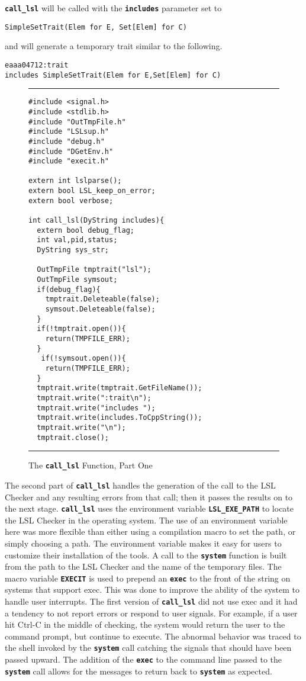 \documentclass[12pt]{article} %
\newcommand{\reserved}[1]{\textbf{\texttt{#1}}} %
\newcommand{\UNSPACEFORBOX}{\vspace{-2ex}}
\newcommand{\HLINE}{\UNSPACEFORBOX%
\begin{flushleft}\rule{\textwidth}{0.01in}\end{flushleft}%
\UNSPACEFORBOX}
\newenvironment{BFIGURE}{

\begin{figure}
\small
\HLINE
}{
\HLINE
\normalsize
\end{figure}
}
\begin{document}
\reserved{call\_lsl} will be called with the \reserved{includes}
parameter set to
\begin{verbatim}
SimpleSetTrait(Elem for E, Set[Elem] for C)
\end{verbatim}
and will generate a temporary trait similar to the following.
\begin{verbatim}
eaaa04712:trait
includes SimpleSetTrait(Elem for E,Set[Elem] for C)
\end{verbatim}

\begin{BFIGURE}
\begin{verbatim}
#include <signal.h>
#include <stdlib.h>
#include "OutTmpFile.h"
#include "LSLsup.h"
#include "debug.h"
#include "DGetEnv.h"
#include "execit.h"

extern int lslparse();
extern bool LSL_keep_on_error;
extern bool verbose;

int call_lsl(DyString includes){
  extern bool debug_flag;
  int val,pid,status;
  DyString sys_str;
  
  OutTmpFile tmptrait("lsl");
  OutTmpFile symsout;
  if(debug_flag){
    tmptrait.Deleteable(false);
    symsout.Deleteable(false);
  }
  if(!tmptrait.open()){
    return(TMPFILE_ERR);
  }
   if(!symsout.open()){
    return(TMPFILE_ERR);
  }
  tmptrait.write(tmptrait.GetFileName());
  tmptrait.write(":trait\n");
  tmptrait.write("includes ");
  tmptrait.write(includes.ToCppString());
  tmptrait.write("\n");
  tmptrait.close();
\end{verbatim}
\caption{The \reserved{call\_lsl} Function, Part One}
\label{calllsl1}
\end{BFIGURE}

The second part of \reserved{call\_lsl} handles the generation of the
call to the LSL Checker and any resulting errors from that call; then it
passes the results on to the next stage. \reserved{call\_lsl} uses 
the environment variable \reserved{LSL\_EXE\_PATH} to locate the LSL
Checker in the operating system. The use of an environment variable here was
more flexible than either using a compilation macro to set the path,
or simply choosing a path. The environment variable makes it easy for
users to customize their installation of the tools. A call to the
\reserved{system} function is built from the path to the LSL
Checker and  the name of the temporary files. The macro variable
\reserved{EXECIT} is used to prepend an \reserved{exec} to the front of the
string on systems that support exec. This was done to improve the
ability of the system to handle user interrupts. The first version of
\reserved{call\_lsl} did not use exec and it had a tendency to not
report errors or respond to user signals. For example, if a user hit
Ctrl-C in the middle of checking, the system would return the user to
the command prompt, but continue to execute. The abnormal behavior was
traced to the shell invoked by the \reserved{system} call catching the signals
that should have been passed upward. The addition of the \reserved{exec} to
the command line passed to the \reserved{system} call allows for the messages
to return back to \reserved{system} as expected. 
\end{document}
